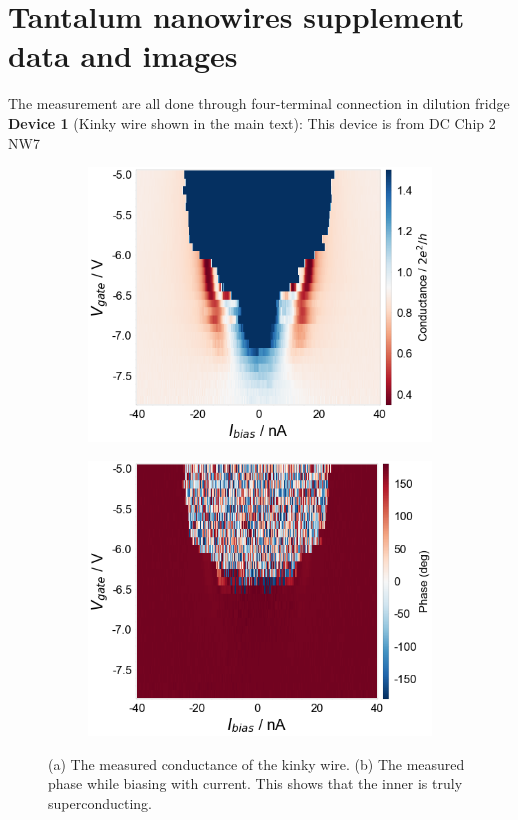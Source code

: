 \section{Tantalum nanowires supplement data and images}
The measurement are all done through four-terminal connection in dilution fridge
\textbf{Device 1} (Kinky wire shown in the main text): This device is from DC Chip 2 NW7
\begin{figure}[htbp]
    \centering
    \begin{subfigure}[b]{0.49\textwidth}
            \centering
            \includegraphics[width=\linewidth]{Pic/KinkyIbiasCond.png}
            \caption{}
            \label{fig:my_label}
     \end{subfigure}
     \hfill
     \begin{subfigure}[b]{0.49\textwidth}
            \centering
            \includegraphics[width=\linewidth]{Pic/KinkyIbiasPhase.png}
            \caption{}
            \label{fig:my_label}
     \end{subfigure}
    \caption{(a) The measured conductance of the kinky wire. (b) The measured phase while biasing with current. This shows that the inner is truly superconducting.}
    \label{Kinkysupp}
\end{figure}
